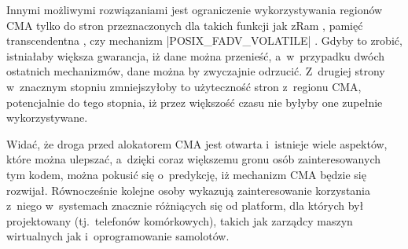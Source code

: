 Innymi możliwymi rozwiązaniami jest ograniczenie wykorzystywania
regionów CMA tylko do stron przeznaczonych dla takich funkcji jak zRam
\autocite{patch:zram}, pamięć transcendentna
\autocite{bib:transcendent}, czy mechanizm \code|POSIX_FADV_VOLATILE|
\autocite{bib:fadv-volatile}.  Gdyby to zrobić, istniałaby większa
gwarancja, iż dane można przenieść, a~w~przypadku dwóch ostatnich
mechanizmów, dane można by zwyczajnie odrzucić.  Z~drugiej strony
w~znacznym stopniu zmniejszyłoby to użyteczność stron z~regionu CMA,
potencjalnie do tego stopnia, iż przez większość czasu nie byłyby one
zupełnie wykorzystywane.

Widać, że droga przed alokatorem CMA jest otwarta i~istnieje wiele
aspektów, które można ulepszać, a~dzięki coraz większemu gronu osób
zainteresowanych tym kodem, można pokusić się o~predykcję, iż
mechanizm CMA będzie się rozwijał.  Równocześnie kolejne osoby
wykazują zainteresowanie korzystania z~niego w~systemach znacznie
różniących się od platform, dla których był projektowany
(tj.\ telefonów komórkowych), takich jak zarządcy maszyn wirtualnych
jak i~oprogramowanie samolotów.
